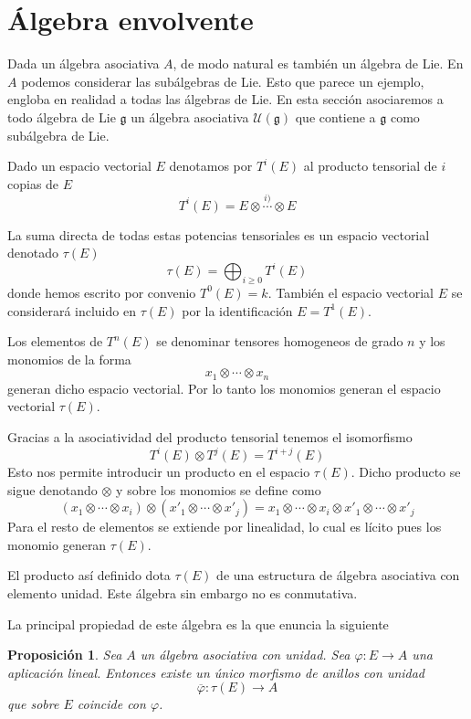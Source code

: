 \documentclass[a4paper,draft,12pt]{article}
\newtheorem{propo}[teo]{Proposición}%
\newcommand{\uni}{\mathcal{U}}%
\newcommand{\lto}{\longrightarrow}%
\begin{document}
\section{Álgebra envolvente}

Dada un álgebra asociativa $A$, de modo natural es también un álgebra de Lie.  En $A$ podemos considerar las subálgebras de Lie.  Esto que parece un ejemplo, engloba en realidad a todas las álgebras de Lie.  En esta sección asociaremos a todo álgebra de Lie $\mathfrak{g}$ un álgebra asociativa $\uni(\mathfrak{g})$ que contiene a $\mathfrak{g}$ como subálgebra de Lie.

\bigskip

Dado un espacio vectorial $E$ denotamos por $T^i(E)$ al producto tensorial de $i$ copias de $E$
$$
T^i(E)= E \otimes \stackrel{i)}{\cdots}\otimes E
$$

La suma directa de todas estas potencias tensoriales es un espacio vectorial denotado $\tau(E)$
$$
\tau(E) = \bigoplus_{i \geq 0} T^i (E)
$$
donde hemos escrito por convenio $T^0(E)=k$.  También el espacio vectorial $E$ se considerará incluido en $\tau(E)$ por la identificación $E= T^1(E)$.

Los elementos de $T^n(E)$ se denominar tensores homogeneos de grado $n$ y los monomios de la forma
$$
x_1 \otimes \cdots \otimes x_n
$$
generan dicho espacio vectorial.  Por lo tanto los monomios generan el espacio vectorial $\tau(E)$.

Gracias a la asociatividad del producto tensorial tenemos el isomorfismo
$$
T^i(E)  \otimes T^j(E)= T^{i+j}(E)
$$
Esto nos permite introducir un producto en el espacio $\tau(E)$.  Dicho producto se sigue denotando $\otimes$ y sobre los monomios se define como
$$
(x_1\otimes \cdots\otimes x_i) \otimes (x'_1 \otimes \cdots \otimes x'_j)= x_1 \otimes \cdots \otimes x_i \otimes x'_1 \otimes \cdots \otimes x'_j
$$
Para el resto de elementos se extiende por linealidad, lo cual es lícito pues los monomio generan $\tau(E)$.

El producto así definido dota $\tau(E)$ de una estructura de álgebra asociativa con elemento unidad.  Este álgebra sin embargo no es conmutativa.

La principal propiedad de este álgebra es la que enuncia la siguiente

\begin{propo}

Sea $A$ un álgebra asociativa con unidad.  Sea $\varphi:E \rightarrow A$ una aplicación lineal.  Entonces existe un único morfismo de anillos con unidad
$$
\overline{\varphi}: \tau(E) \lto A
$$
que sobre $E$ coincide con $\varphi$.

\end{propo}
\end{document}
